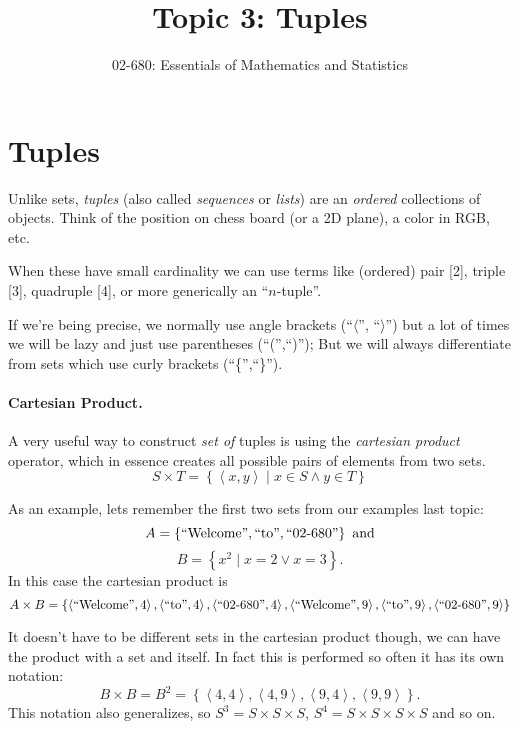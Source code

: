 


\title{Topic 3: Tuples}
\author{02-680: Essentials of Mathematics and Statistics}


\maketitle

\section{Tuples}
Unlike sets, \emph{tuples} (also called \emph{sequences} or \emph{lists}) are an \textit{ordered} collections of objects.
Think of the position on chess board (or a 2D plane), a color in RGB, etc. 

When these have small cardinality we can use terms like (ordered) pair [2], triple [3], quadruple [4], or more generically an ``$n$-tuple''.

If we're being precise, we normally use angle brackets (``$\langle$'', ``$\rangle$'') but a lot of times we will be lazy and just use parentheses (``('',``)''); 
But we will always differentiate from sets which use curly brackets (``\{'',``\}'').

\paragraph{Cartesian Product.}
A very useful way to construct \emph{set of} tuples is using the \emph{cartesian product} operator, 
which in essence creates all possible pairs of elements from two sets.
\[
S \times T = \left\{\left\langle x,y\right\rangle \mid x \in S \wedge y\in T\right\}
\]

As an example, lets remember the first two sets from our examples last topic: 
\[
A = \left\{\textnormal{``Welcome''}, \textnormal{``to''}, \textnormal{``02-680''}\right\} \textnormal{ and}
\]\[
B = \left\{x^2 \mid x=2 \vee x=3 \right\}.
\]
In this case the cartesian product is 
\[
A \times B = \left\{ \left\langle\textnormal{``Welcome''},4\right\rangle, \left\langle\textnormal{``to''},4\right\rangle, \left\langle\textnormal{``02-680''},4\right\rangle,
 \left\langle\textnormal{``Welcome''},9\right\rangle, \left\langle\textnormal{``to''},9\right\rangle, \left\langle\textnormal{``02-680''},9\right\rangle \right\}
\]

It doesn't have to be different sets in the cartesian product though, we can have the product with a set and itself.
In fact this is performed so often it has its own notation:
\[
B \times B = B^2 = \left\{ \left\langle 4,4 \right\rangle, \left\langle 4,9 \right\rangle,  \left\langle 9,4 \right\rangle, \left\langle 9,9 \right\rangle \right\}.
\]
This notation also generalizes, so $S^3 = S \times S \times S$, $S^4 = S\times S\times S\times S$ and so on.

